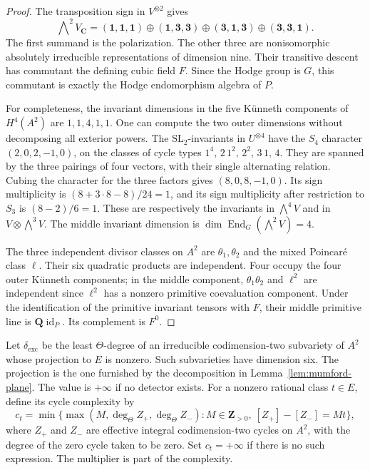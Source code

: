\documentclass[11pt]{article}
\theoremstyle{definition}
\theoremstyle{remark}
\newcommand{\Q}{\mathbf Q}
\newcommand{\Z}{\mathbf Z}
\newcommand{\C}{\mathbf C}
\begin{document}
\begin{proof}
The transposition sign in $V^{\otimes2}$ gives
\[
 \bigwedge\nolimits^2V_{\C}
  =(\mathbf1,\mathbf1,\mathbf1)
   \oplus(\mathbf1,\mathbf3,\mathbf3)
   \oplus(\mathbf3,\mathbf1,\mathbf3)
   \oplus(\mathbf3,\mathbf3,\mathbf1).
\]
The first summand is the polarization. The other three are
nonisomorphic absolutely irreducible representations of dimension nine.
Their transitive descent has commutant the defining cubic field $F$.
Since the Hodge group is $G$, this commutant is exactly the Hodge
endomorphism algebra of $P$.

For completeness, the invariant dimensions in the five K\"unneth
components of $H^4(A^2)$ are $1,1,4,1,1$. One can compute the two outer
dimensions without decomposing all exterior powers. The
$\mathrm{SL}_2$-invariants in $U^{\otimes4}$ have the $S_4$ character
$(2,0,2,-1,0)$, on the classes of cycle types
$1^4,\,2\,1^2,\,2^2,\,3\,1,\,4$. They are spanned by the three pairings
of four vectors, with their single alternating relation. Cubing the
character for the three factors gives $(8,0,8,-1,0)$.
Its sign multiplicity is
$(8+3\cdot8-8)/24=1$, and its sign multiplicity after restriction
to $S_3$ is $(8-2)/6=1$. These are respectively the invariants in
$\bigwedge^4V$ and in $V\otimes\bigwedge^3V$. The middle invariant
dimension is $\dim\operatorname{End}_G(\bigwedge^2V)=4$.

The three independent divisor classes on $A^2$ are
$\theta_1,\theta_2$ and the mixed Poincar\'e class $\ell$.
Their six quadratic products are independent. Four occupy the four
outer K\"unneth components; in the middle component,
$\theta_1\theta_2$ and $\ell^2$ are independent since $\ell^2$ has a
nonzero primitive coevaluation component. Under the identification of
the primitive invariant tensors with $F$, their middle primitive
line is $\Q\operatorname{id}_P$. Its complement is $F^0$.
\end{proof}

Let $\delta_{\mathrm{exc}}$ be the least $\Theta$-degree of an
irreducible codimension-two subvariety of $A^2$ whose projection to $E$
is nonzero. Such subvarieties have dimension six. The projection is the
one furnished by the decomposition in Lemma~\ref{lem:mumford-plane}.
The value is $+\infty$ if no detector exists.  For a nonzero rational
class $t\in E$, define its cycle complexity by
\[
 c_t=\min\{\max(M,\deg_\Theta Z_+,\deg_\Theta Z_-):
       M\in\Z_{>0},\ [Z_+]-[Z_-]=Mt\},
\]
where $Z_+$ and $Z_-$ are effective integral codimension-two cycles
on $A^2$, with the degree of the zero cycle taken to be zero.
Set $c_t=+\infty$ if there is no such expression.
The multiplier is part of the complexity.
\end{document}
